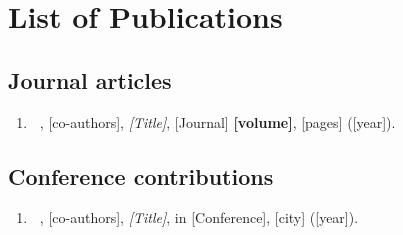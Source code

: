 \chapter*{List of Publications}

\RaggedRight %

\section*{Journal articles}
\begin{enumerate}
    \item \textbf{\thesisauthorinitials~\thesisauthorlastname}, [co-authors], \textit{[Title]}, [Journal] \textbf{[volume]}, [pages] ([year]).
\end{enumerate}

\section*{Conference contributions}
\begin{enumerate}
    \item \textbf{\thesisauthorinitials~\thesisauthorlastname}, [co-authors], \textit{[Title]}, in [Conference], [city] ([year]).
\end{enumerate}
